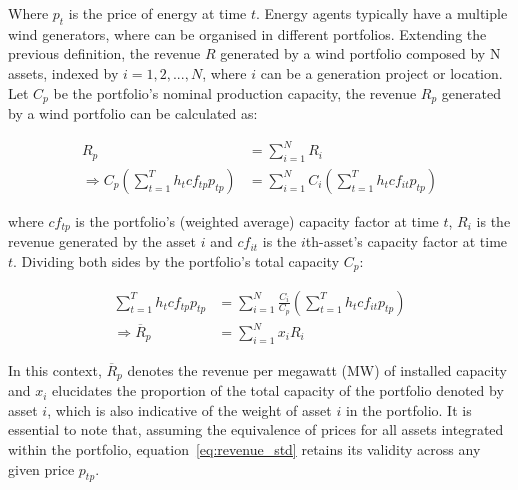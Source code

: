     Where $p_{t}$ is the price of energy at time $t$.
    Energy agents typically have a multiple wind generators, where can be organised in different portfolios.
    Extending the previous definition, the revenue $R$ generated by a wind portfolio composed by N assets, indexed by
    $i= 1,2, ..., N$, where $i$ can be a generation project or location.
    Let $C_{p}$ be the portfolio's nominal production capacity,
    the revenue $R_{p}$ generated by a wind portfolio can be calculated as:

    \begin{align}
        R_{p} &= \sum_{i=1}^{N} R_{i} \\
        \Rightarrow C_{p} \left( \sum_{t=1}^{T} h_{t} cf_{tp} p_{tp} \right) &=
        \sum_{i=1}^{N} C_{i} \left(  \sum_{t=1}^{T} h_{t} cf_{it} p_{tp} \right)
    \label{eq:revenue_pf}
    \end{align}

    where $cf_{tp}$ is the portfolio's (weighted average) capacity factor at time $t$, $R_{i}$ is the revenue generated by
    the asset $i$ and $cf_{it}$ is the $i$th-asset's capacity factor at time $t$.
    Dividing both sides by the portfolio's total capacity $C_{p}$:

    \begin{align}
        \sum_{t=1}^{T} h_{t} cf_{tp} p_{tp} &=
        \sum_{i=1}^{N} \frac{C_{i}}{C_{p}} \left(  \sum_{t=1}^{T} h_{t} cf_{it} p_{tp} \right) \\
        \Rightarrow \overline{R}_{p} &= \sum_{i=1}^{N} x_{i} R_{i}
    \label{eq:revenue_std}
    \end{align}

    In this context, $\overline{R}_{p}$ denotes the revenue per megawatt (MW) of installed capacity and $x_{i}$
    elucidates the proportion of the total capacity of the portfolio denoted by asset $i$,
    which is also indicative of the weight of asset $i$ in the portfolio.
    It is essential to note that, assuming the equivalence of prices for all assets integrated within the portfolio,
    equation~\ref{eq:revenue_std} retains its validity across any given price $p_{tp}$.








